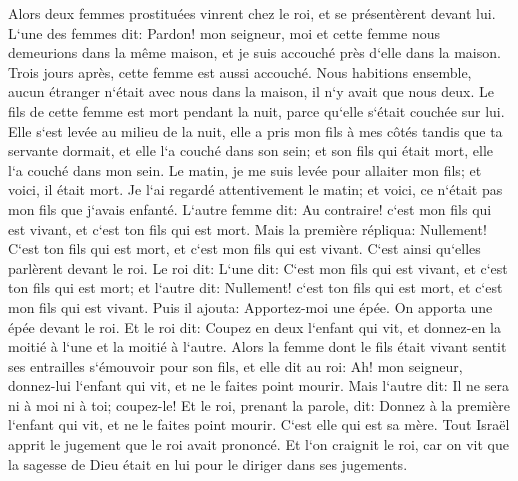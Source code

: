 \verse Alors deux femmes prostituées vinrent chez le roi, et se présentèrent devant lui. 
\verse L`une des femmes dit: Pardon! mon seigneur, moi et cette femme nous demeurions dans la même maison, et je suis accouché près d`elle dans la maison. 
\verse Trois jours après, cette femme est aussi accouché. Nous habitions ensemble, aucun étranger n`était avec nous dans la maison, il n`y avait que nous deux. 
\verse Le fils de cette femme est mort pendant la nuit, parce qu`elle s`était couchée sur lui. 
\verse Elle s`est levée au milieu de la nuit, elle a pris mon fils à mes côtés tandis que ta servante dormait, et elle l`a couché dans son sein; et son fils qui était mort, elle l`a couché dans mon sein. 
\verse Le matin, je me suis levée pour allaiter mon fils; et voici, il était mort. Je l`ai regardé attentivement le matin; et voici, ce n`était pas mon fils que j`avais enfanté. 
\verse L`autre femme dit: Au contraire! c`est mon fils qui est vivant, et c`est ton fils qui est mort. Mais la première répliqua: Nullement! C`est ton fils qui est mort, et c`est mon fils qui est vivant. C`est ainsi qu`elles parlèrent devant le roi. 
\verse Le roi dit: L`une dit: C`est mon fils qui est vivant, et c`est ton fils qui est mort; et l`autre dit: Nullement! c`est ton fils qui est mort, et c`est mon fils qui est vivant. 
\verse Puis il ajouta: Apportez-moi une épée. On apporta une épée devant le roi. 
\verse Et le roi dit: Coupez en deux l`enfant qui vit, et donnez-en la moitié à l`une et la moitié à l`autre. 
\verse Alors la femme dont le fils était vivant sentit ses entrailles s`émouvoir pour son fils, et elle dit au roi: Ah! mon seigneur, donnez-lui l`enfant qui vit, et ne le faites point mourir. Mais l`autre dit: Il ne sera ni à moi ni à toi; coupez-le! 
\verse Et le roi, prenant la parole, dit: Donnez à la première l`enfant qui vit, et ne le faites point mourir. C`est elle qui est sa mère. 
\verse Tout Israël apprit le jugement que le roi avait prononcé. Et l`on craignit le roi, car on vit que la sagesse de Dieu était en lui pour le diriger dans ses jugements. 

